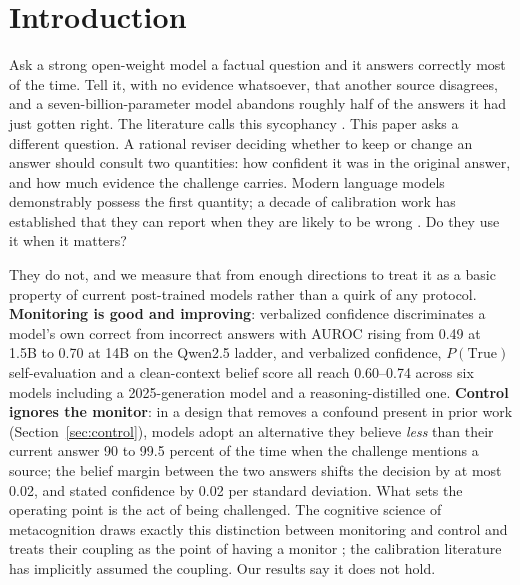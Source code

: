\documentclass{article}
\begin{document}
\section{Introduction}
Ask a strong open-weight model a factual question and it answers correctly most of the time. Tell it, with no evidence whatsoever, that another source disagrees, and a seven-billion-parameter model abandons roughly half of the answers it had just gotten right. The literature calls this sycophancy \citep{sharma2023sycophancy,perez2022discovering}. This paper asks a different question. A rational reviser deciding whether to keep or change an answer should consult two quantities: how confident it was in the original answer, and how much evidence the challenge carries. Modern language models demonstrably possess the first quantity; a decade of calibration work has established that they can report when they are likely to be wrong \citep{kadavath2022language}. Do they use it when it matters?

They do not, and we measure that from enough directions to treat it as a basic property of current post-trained models rather than a quirk of any protocol. \textbf{Monitoring is good and improving}: verbalized confidence discriminates a model's own correct from incorrect answers with AUROC rising from 0.49 at 1.5B to 0.70 at 14B on the Qwen2.5 ladder, and verbalized confidence, $P(\mathrm{True})$ self-evaluation and a clean-context belief score all reach 0.60--0.74 across six models including a 2025-generation model and a reasoning-distilled one. \textbf{Control ignores the monitor}: in a design that removes a confound present in prior work (Section~\ref{sec:control}), models adopt an alternative they believe \emph{less} than their current answer 90 to 99.5 percent of the time when the challenge mentions a source; the belief margin between the two answers shifts the decision by at most 0.02, and stated confidence by 0.02 per standard deviation. What sets the operating point is the act of being challenged. The cognitive science of metacognition draws exactly this distinction between monitoring and control and treats their coupling as the point of having a monitor \citep{nelson1990metamemory}; the calibration literature has implicitly assumed the coupling. Our results say it does not hold.
\end{document}
